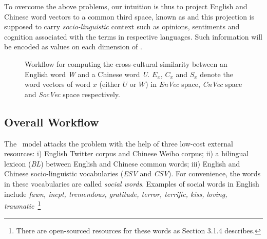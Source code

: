 To overcome the above problems, our intuition is thus 
to project English and Chinese word vectors to a common third space, 
known as \textit{\socvec} and this projection is supposed to carry 
\emph{socio-linguistic} context such as opinions, sentiments and cognition 
associated with the terms in respective languages. 
Such information will be encoded as values on each 
dimension of \textit{\socvec}.
%
\begin{figure}[th!]
	\centering
	\caption{Workflow for computing the cross-cultural similarity between an English word \textit{W} and a Chinese word \textit{U}. $E_x$, $C_x$ and $S_x$ denote the word vectors of word $x$ (either $U$ or $W$) in \textit{EnVec} space, \textit{CnVec} space and \textit{SocVec} space respectively.  }
	\label{fig:overview}
\end{figure}

\subsection{Overall Workflow}
The \textit{\socvec}~model attacks the problem with the help of three low-cost external resources: 
i) English Twitter corpus and Chinese Weibo corpus; ii) a bilingual lexicon (\textit{BL}) between 
 English and Chinese common words;  
iii) English and Chinese socio-linguistic vocabularies 
(\textit{ESV} and \textit{CSV}).
For convenience, the words in these vocabularies are called
{\em social words}. Examples of social words in English include
\textit{fawn, inept, tremendous, gratitude,
terror, terrific, kiss, loving, traumatic}~\footnote{There are open-sourced
resources for these words as Section 3.1.4 describes.}

